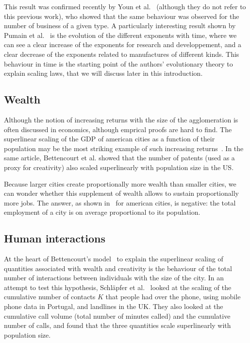 This result was confirmed recently by Youn et al.~\cite{Youn:2014} (although
they do not refer to this previous work), who showed that the same behaviour was
observed for the number of business of a given type. A particularly interesting
result shown by Pumain et al.~\cite{Pumain:2006} is the evolution of the
different exponents with time, where we can see a clear increase of the
exponents for research and developpement, and a clear decrease of the exponents
related to manufactures of different kinds. This behaviour in time is the
starting point of the authors' evolutionary theory to explain scaling laws, that
we will discuss later in this introduction.\\


\subsection{Wealth}
\label{sub:wealth}

Although the notion of increasing returns with the size of the agglomeration is
often discussed in economics, although emprical proofs are hard to find. The
superlinear scaling of the GDP of american cities as a function of their
population may be the most striking example of such increasing
returns~\cite{Bettencourt:2007}. In the same article, Bettencourt et al. showed
that the number of patents (used as a proxy for creativity) also scaled
superlinearly with population size in the US.

Because larger cities create proportionally more wealth than smaller cities, we
can wonder whether this supplement of wealth allows to sustain proportionally
more jobs. The answer, as shown in~\cite{Bettencourt:2014} for american cities,
is negative: the total employment of a city is on average proportional to its population.

\subsection{Human interactions}
\label{sub:human_interactions}

At the heart of Bettencourt's model~\cite{Bettencourt:2013} to explain the
superlinear scaling of quantities associated with wealth and creativity is the
behaviour of the total number of interactions between individuals with the size
of the city. In an attempt to test this hypothesis, Schl\"apfer et
al.~\cite{Schlapfer:2014} looked at the scaling of the cumulative number of
contacts $K$ that people had over the phone, using mobile phone data in
Portugal, and landlines in the UK. They also looked at the cumulative call
volume (total number of minutes called) and the cumulative number of calls, and
found that the three quantities scale superlinearly with population size. 

